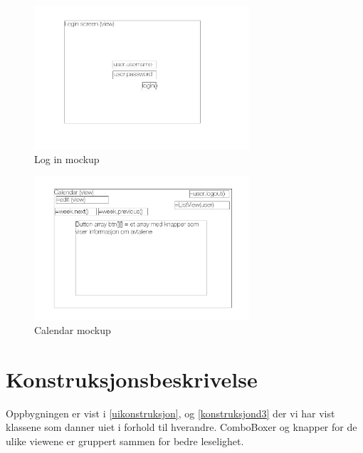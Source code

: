 \documentclass{article}
\begin{document}
\begin{figure}[h!] 
    \begin{center} 
        \includegraphics[width=8cm]{login_screen.png}
        \caption{Log in mockup}
    \label{loginmockup}
    \end{center}
\end{figure}

\begin{figure}[h!] 
    \begin{center} 
        \includegraphics[width=8cm]{Calendar_view.png}
        \caption{Calendar mockup}
    \label{mainmockup}
    \end{center}
\end{figure}









\section{Konstruksjonsbeskrivelse}
Oppbygningen er vist i \ref{uikonstruksjon}, og \ref{konstruksjond3} der vi har vist klassene som danner uiet i forhold til hverandre. ComboBoxer og knapper for de ulike viewene er gruppert sammen for bedre leselighet. 
\end{document}
